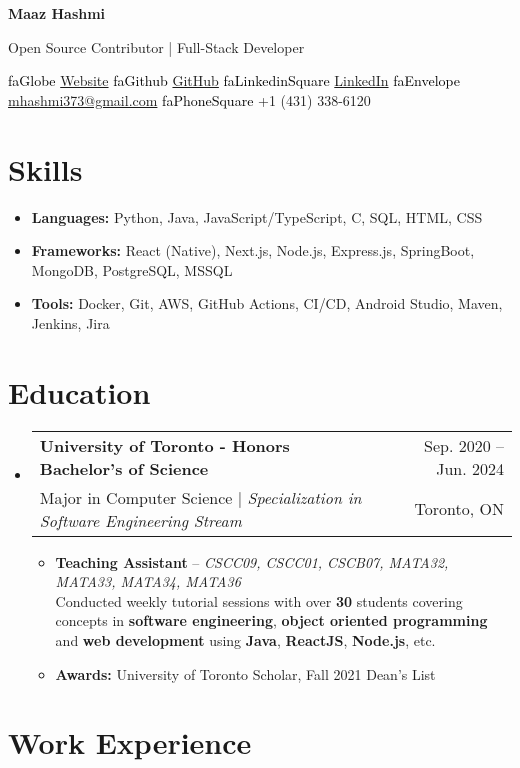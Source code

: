 \documentclass[letterpaper,11pt]{article}
\makeatletter
\newcommand{\resumeItem}[1]{
  \item\small{
    {#1 \vspace{-2pt}}
  }
}
\newcommand{\skillsItem}[1]{
  \item\small{
    {#1 \vspace{-6pt}}
  }
}
\newcommand{\resumeSubheading}[5]{
  \vspace{-1pt}\item
  \begin{tabular*}{0.97\textwidth}{l@{\extracolsep{\fill}}r}
    \textbf{#1} & #2 \\
    \small{#3 | \textit{#4}} & \small {#5} \\
  \end{tabular*}\vspace{-5pt}
}
\newcommand{\resumeSubHeadingListStart}{\begin{itemize}[leftmargin=*,label={}]}
\newcommand{\resumeSubHeadingListEnd}{\end{itemize}}
\newcommand{\resumeItemListStart}{\begin{itemize}}
\newcommand{\resumeItemListEnd}{\end{itemize}\vspace{-5pt}}
\newcommand{\seticon}[1]{\textcolor{black}{\csname #1\endcsname}}
\makeatother
\begin{document}
\begin{center}
  \textbf{\huge{Maaz Hashmi}} \\
  \begin{center}
    Open Source Contributor | Full-Stack Developer
  \end{center}
  \vspace*{0.4cm}
  \seticon{faGlobe} \href{https://maazh.tech}{Website}\qquad
  \seticon{faGithub} \href{https://github.com/maazh10}{GitHub}\qquad
  \seticon{faLinkedinSquare}
  \href{https://www.linkedin.com/in/maaz-hashmi-526a82222/}{LinkedIn}\qquad
  \seticon{faEnvelope}
  \href{mailto:mhashmi373@gmail.com}{mhashmi373@gmail.com}\qquad
  \seticon{faPhoneSquare} +1 (431) 338-6120
\end{center}

\section{Skills}
\resumeSubHeadingListStart
\skillsItem
{\textbf{Languages:} Python, Java, JavaScript/TypeScript, C, SQL, HTML, CSS}
\skillsItem
{\textbf{Frameworks:} React (Native), Next.js, Node.js, Express.js, SpringBoot, MongoDB, PostgreSQL, MSSQL}
\skillsItem
{\textbf{Tools:} Docker, Git, AWS, GitHub Actions, CI/CD, Android Studio, Maven, Jenkins, Jira}
\resumeSubHeadingListEnd

\section{Education}
\resumeSubHeadingListStart
\resumeSubheading
{University of Toronto - Honors Bachelor's of Science}{Sep. 2020 -- Jun.
  2024}
{Major in Computer Science}{Specialization in Software Engineering
  Stream}{Toronto, ON}
\resumeItemListStart
\resumeItem
{\textbf{Teaching Assistant} -- \textit{CSCC09, CSCC01, CSCB07, MATA32, MATA33, MATA34, MATA36} \\ Conducted weekly tutorial sessions with over \textbf{30} students
  covering concepts in \textbf{software engineering}, \textbf{object oriented
    programming} and \textbf{web development} using \textbf{Java}, \textbf{ReactJS}, \textbf{Node.js}, etc. }
\resumeItem
{\textbf{Awards:} University of Toronto Scholar, Fall 2021 Dean's
  List}
\resumeItemListEnd
\resumeSubHeadingListEnd

\section{Work Experience}
\end{document}
